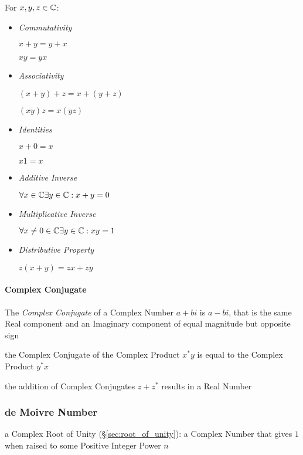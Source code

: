 For $x,y,z \in \mathbb{C}$:
\begin{itemize}
\item \emph{Commutativity}

$x + y = y + x$

$xy = yx$


\item \emph{Associativity}

$(x + y) + z = x + (y + z)$

$(xy)z = x(yz)$


\item \emph{Identities}

$x + 0 = x$

$x1 = x$


\item \emph{Additive Inverse}

$\forall x \in \mathbb{C} \exists y \in \mathbb{C} : x + y = 0$


\item \emph{Multiplicative Inverse}

$\forall x \neq 0 \in \mathbb{C} \exists y \in \mathbb{C} : xy = 1$


\item \emph{Distributive Property}

$z (x + y) = zx + zy$

\end{itemize}



\paragraph{Complex Conjugate}\label{sec:complex_conjugate}\hfill

The \emph{Complex Conjugate} of a Complex Number $a + bi$ is $a - bi$, that is
the same Real component and an Imaginary component of equal magnitude but
opposite sign

the Complex Conjugate of the Complex Product $x^*y$ is equal to the Complex
Product $y^*x$

the addition of Complex Conjugates $z + z^*$ results in a Real Number



\subsubsection{de Moivre Number}\label{sec:demoivre_number}

a Complex Root of Unity (\S\ref{sec:root_of_unity}):
a Complex Number that gives $1$ when raised to some Positive Integer Power $n$

